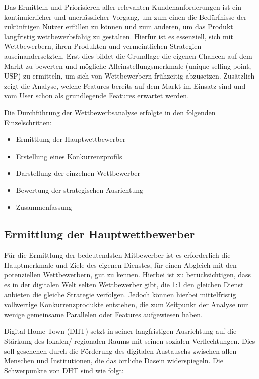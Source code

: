 
Das Ermitteln und Priorisieren aller relevanten Kundenanforderungen ist ein kontinuierlicher und unerlässlicher Vorgang, um zum einen die Bedürfnisse der zukünftigen Nutzer erfüllen zu können und zum anderen, um das Produkt langfristig wettbewerbsfähig zu gestalten. Hierfür ist es essenziell, sich mit Wettbewerbern, ihren Produkten und vermeintlichen Strategien auseinandersetzten. Erst dies bildet die Grundlage die eigenen Chancen auf dem Markt zu bewerten und mögliche Alleinstellungsmerkmale (\engl unique selling point, USP) zu ermitteln, um sich von Wettbewerbern frühzeitig abzusetzen. Zusätzlich zeigt die Analyse, welche Features bereits auf dem Markt im Einsatz sind und vom User \ggf schon als grundlegende Features erwartet werden.

Die Durchführung der Wettbewerbsanalyse erfolgte in den folgenden Einzelschritten:

\begin{itemize}
    \item Ermittlung der Hauptwettbewerber
    \item Erstellung eines Konkurrenzprofils
    \item Darstellung der einzelnen Wettbewerber
    \item Bewertung der strategischen Ausrichtung
    \item Zusammenfassung
\end{itemize}

\subsection{Ermittlung der Hauptwettbewerber}

Für die Ermittlung der bedeutendsten Mitbewerber ist es erforderlich die Hauptmerkmale und Ziele des eigenen Dienstes, für einen Abgleich mit den potenziellen Wettbewerbern, gut zu kennen. Hierbei ist zu berücksichtigen, dass es in der digitalen Welt selten Wettbewerber gibt, die 1:1 den gleichen Dienst anbieten \bzw die gleiche Strategie verfolgen. Jedoch können hierbei mittelfristig vollwertige Konkurrenzprodukte entstehen, die zum Zeitpunkt der Analyse nur wenige gemeinsame Parallelen oder Features aufgewiesen haben.

Digital Home Town (DHT) setzt in seiner langfristigen Ausrichtung auf die Stärkung des lokalen/ regionalen Raums mit seinen sozialen Verflechtungen. Dies soll geschehen durch die Förderung des digitalen Austauschs zwischen allen Menschen und Institutionen, die das örtliche Dasein widerspiegeln. Die Schwerpunkte von DHT sind wie folgt:

